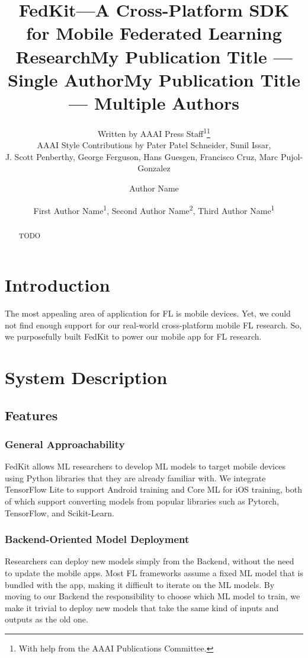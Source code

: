 \documentclass[letterpaper]{article} %
\title{FedKit---A Cross-Platform SDK for Mobile Federated Learning Research}
\author{
    Written by AAAI Press Staff\textsuperscript{\rm 1}\thanks{With help from the AAAI Publications Committee.}\\
    AAAI Style Contributions by Pater Patel Schneider,
    Sunil Issar,\\
    J. Scott Penberthy,
    George Ferguson,
    Hans Guesgen,
    Francisco Cruz\equalcontrib,
    Marc Pujol-Gonzalez\equalcontrib
}
\title{My Publication Title --- Single Author}
\author {
    Author Name
}
\title{My Publication Title --- Multiple Authors}
\author {
    First Author Name\textsuperscript{\rm 1},
    Second Author Name\textsuperscript{\rm 2},
    Third Author Name\textsuperscript{\rm 1}
}
\begin{document}
\maketitle

\begin{abstract}
    TODO
\end{abstract}

\section{Introduction}
The most appealing area of application for FL is mobile devices.
Yet, we could not find enough support for our real-world cross-platform mobile
FL research.
So, we purposefully built FedKit to power our mobile app for FL research.

\section{System Description}

\newcommand{\model}{$M$}
\newcommand{\fs}{$S_F$}

\subsection{Features}

\subsubsection{General Approachability}
FedKit allows ML researchers to develop ML models to target mobile devices
using Python libraries that they are already familiar with.
We integrate TensorFlow Lite to support Android training and Core ML for iOS
training,
both of which support converting models from popular libraries such as Pytorch,
TensorFlow, and Scikit-Learn.

\subsubsection{Backend-Oriented Model Deployment}
Researchers can deploy new models simply from the Backend,
without the need to update the mobile apps.
Most FL frameworks assume a fixed ML model that is bundled with the app,
making it difficult to iterate on the ML models.
By moving to our Backend the responsibility to choose which ML model to train,
we make it trivial to deploy new models that take the same kind of inputs and
outputs as the old one.
\end{document}
